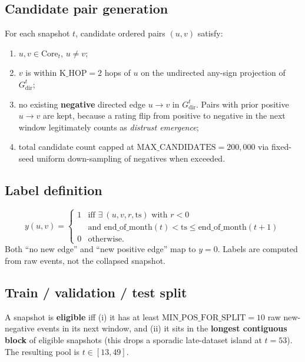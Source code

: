 \documentclass[11pt,a4paper]{article}
\begin{document}
\subsection{Candidate pair generation}
For each snapshot $t$, candidate ordered pairs $(u, v)$ satisfy:
\begin{enumerate}[nosep]
  \item $u, v \in \mathrm{Core}_t$, $u \neq v$;
  \item $v$ is within $\mathrm{K\_HOP} = 2$ hops of $u$ on the undirected
        any-sign projection of $G^t_{\mathrm{dir}}$;
  \item no existing \textbf{negative} directed edge $u \to v$ in
        $G^t_{\mathrm{dir}}$. Pairs with prior positive $u \to v$ are kept,
        because a rating flip from positive to negative in the next window
        legitimately counts as \emph{distrust emergence};
  \item total candidate count capped at $\mathrm{MAX\_CANDIDATES} = 200{,}000$
        via fixed-seed uniform down-sampling of negatives when exceeded.
\end{enumerate}

\subsection{Label definition}
\begin{equation*}
y(u, v) =
\begin{cases}
1 & \text{iff } \exists\ (u, v, r, \mathrm{ts}) \text{ with } r < 0 \\
  & \text{and } \mathrm{end\_of\_month}(t) < \mathrm{ts} \leq \mathrm{end\_of\_month}(t{+}1) \\
0 & \text{otherwise}.
\end{cases}
\end{equation*}
Both ``no new edge'' and ``new positive edge'' map to $y = 0$. Labels are
computed from raw events, not the collapsed snapshot.

\subsection{Train / validation / test split}
A snapshot is \textbf{eligible} iff (i) it has at least
$\mathrm{MIN\_POS\_FOR\_SPLIT} = 10$ raw new-negative events in its next
window, and (ii) it sits in the \textbf{longest contiguous block} of eligible
snapshots (this drops a sporadic late-dataset island at $t = 53$). The
resulting pool is $t \in [13, 49]$.
\end{document}
